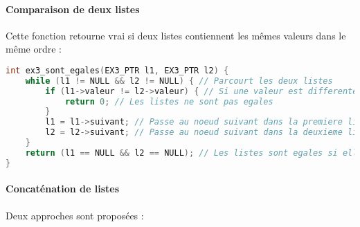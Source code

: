 \documentclass[a4paper,12pt]{article}
\begin{document}
\paragraph{Comparaison de deux listes}  
Cette fonction retourne vrai si deux listes contiennent les mêmes valeurs dans le même ordre :

\begin{lstlisting}[language=C, caption={Comparaison de deux listes}]
int ex3_sont_egales(EX3_PTR l1, EX3_PTR l2) {
    while (l1 != NULL && l2 != NULL) { // Parcourt les deux listes
        if (l1->valeur != l2->valeur) { // Si une valeur est differente
            return 0; // Les listes ne sont pas egales
        }
        l1 = l1->suivant; // Passe au noeud suivant dans la premiere liste
        l2 = l2->suivant; // Passe au noeud suivant dans la deuxieme liste
    }
    return (l1 == NULL && l2 == NULL); // Les listes sont egales si elles ont la meme longueur
}

\end{lstlisting}

\paragraph{Concaténation de listes}  
Deux approches sont proposées :
\end{document}
